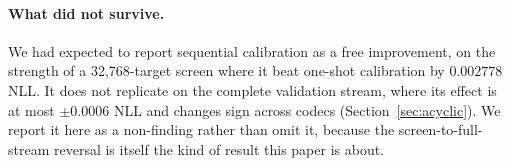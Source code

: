 \paragraph{What did not survive.} We had expected to report sequential
calibration as a free improvement, on the strength of a 32{,}768-target screen
where it beat one-shot calibration by $0.002778$ NLL. It does not replicate on
the complete validation stream, where its effect is at most $\pm0.0006$ NLL and
changes sign across codecs (Section~\ref{sec:acyclic}). We report it here as a
non-finding rather than omit it, because the screen-to-full-stream reversal is
itself the kind of result this paper is about.
